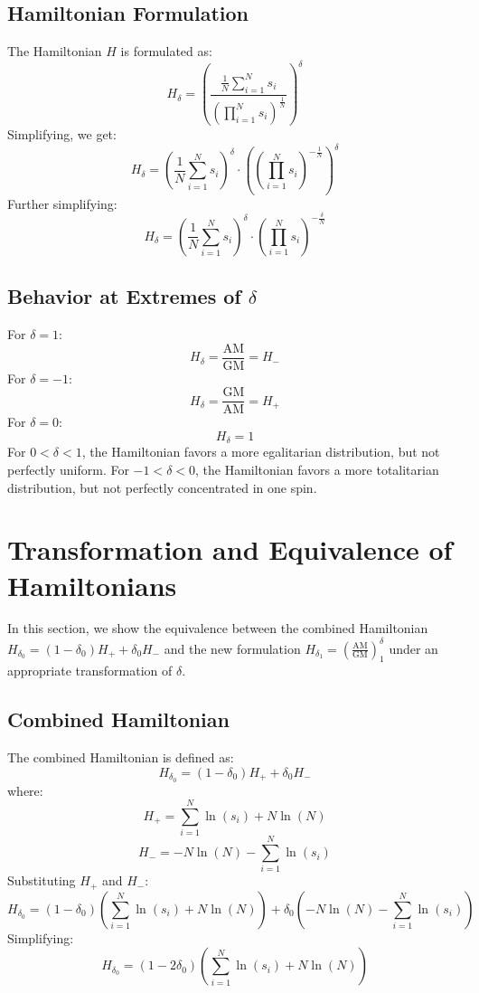 \documentclass{article}
\begin{document}
\subsection{Hamiltonian Formulation}

The Hamiltonian \( H \) is formulated as:
\[
H_\delta = \left( \frac{\frac{1}{N} \sum_{i=1}^N s_i}{\left( \prod_{i=1}^N s_i \right)^{\frac{1}{N}}} \right)^\delta
\]
Simplifying, we get:
\[
H_\delta = \left( \frac{1}{N} \sum_{i=1}^N s_i \right)^\delta \cdot \left( \left( \prod_{i=1}^N s_i \right)^{-\frac{1}{N}} \right)^\delta
\]
Further simplifying:
\[
H_\delta = \left( \frac{1}{N} \sum_{i=1}^N s_i \right)^\delta \cdot \left( \prod_{i=1}^N s_i \right)^{-\frac{\delta}{N}}
\]

\subsection{Behavior at Extremes of \(\delta\)}

For \(\delta = 1\):
\[
H_\delta = \frac{\text{AM}}{\text{GM}} = H_-
\]
For \(\delta = -1\):
\[
H_\delta = \frac{\text{GM}}{\text{AM}} = H_+
\]
For \( \delta = 0 \):
\[
H_\delta = 1
\]
For \(0 < \delta < 1\), the Hamiltonian favors a more egalitarian distribution, but not perfectly uniform. For \(-1 < \delta < 0\), the Hamiltonian favors a more totalitarian distribution, but not perfectly concentrated in one spin.

\section{Transformation and Equivalence of Hamiltonians}

In this section, we show the equivalence between the combined Hamiltonian \( H_{\delta_0} = (1 - \delta_0) H_+ + \delta_0 H_- \) and the new formulation \( H_{\delta_1} = \left( \frac{\text{AM}}{\text{GM}} \right)^\delta_1 \) under an appropriate transformation of \(\delta\).

\subsection{Combined Hamiltonian}

The combined Hamiltonian is defined as:
\[
H_{\delta_0} = (1 - \delta_0) H_+ + \delta_0 H_-
\]
where:
\[
H_+ = \sum_{i=1}^N \ln(s_i) + N \ln(N)
\]
\[
H_- = -N \ln(N) - \sum_{i=1}^N \ln(s_i)
\]
Substituting \( H_+ \) and \( H_- \):
\[
H_{\delta_0} = (1 - \delta_0) \left( \sum_{i=1}^N \ln(s_i) + N \ln(N) \right) + \delta_0 \left( -N \ln(N) - \sum_{i=1}^N \ln(s_i) \right)
\]
Simplifying:
\[
H_{\delta_0} = (1 - 2\delta_0) \left( \sum_{i=1}^N \ln(s_i) + N \ln(N) \right)
\]
\end{document}
